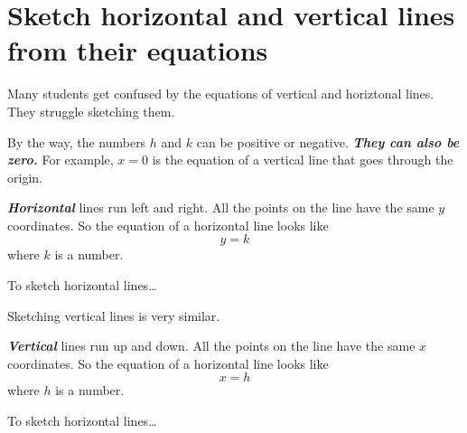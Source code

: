\section*{Sketch horizontal and vertical lines from their equations}

Many students get confused by the equations of vertical and horiztonal lines.
They struggle sketching them.


By the way, the numbers $h$ and $k$ can be positive or negative.
{\bfseries\itshape They can also be zero.}
For example, $x=0$ is the equation of a vertical line that goes through the origin.

\begin{center}
    \begin{tcolorbox}[width=5in]
        {\bfseries\itshape Horizontal} lines run left and right.
        All the points on the line have the same $y$ coordinates.
        So the equation of a horizontal line looks like
        \[ y = k \]
        where $k$ is a number.
    \end{tcolorbox}
\end{center}

\begin{myConceptSteps}{To sketch horizontal lines\dots}
\end{myConceptSteps}








Sketching vertical lines is very similar.
\begin{center}
    \begin{tcolorbox}[width=5in]
        {\bfseries\itshape Vertical} lines run up and down.
        All the points on the line have the same $x$ coordinates.
        So the equation of a horizontal line looks like
        \[ x = h \]
        where $h$ is a number.
    \end{tcolorbox}
\end{center}

\begin{myConceptSteps}{To sketch horizontal lines\dots}
\end{myConceptSteps}





